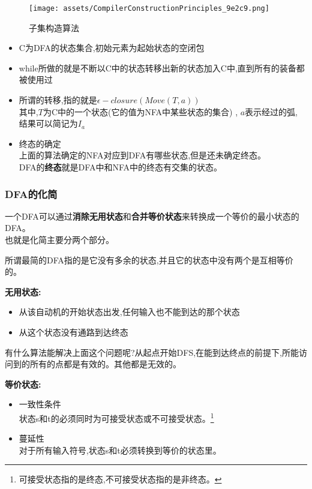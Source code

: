 \documentclass[UTF8,a4paper]{ctexart}
\newcommand{\spaceline}{\vspace{\baselineskip}}
\begin{document}
  \begin{figure}[H]
    \centering
    \texttt{[image: assets/CompilerConstructionPrinciples\_9e2c9.png]}
    \caption{子集构造算法}
    \label{fig-zijifa}
  \end{figure}

  \begin{itemize}
    \item C为DFA的状态集合,初始元素为起始状态的空闭包
    \item while所做的就是不断以C中的状态转移出新的状态加入C中,直到所有的装备都被使用过
    \item 所谓的转移,指的就是$\epsilon-closure(Move(T,a))$\\
    其中,$T$为C中的一个状态(它的值为NFA中某些状态的集合) , $a$表示经过的弧, 结果可以简记为$I_a$
    \item 终态的确定\\
    上面的算法确定的NFA对应到DFA有哪些状态,但是还未确定终态。\\
    DFA的\textbf{终态}就是DFA中和NFA中的终态有交集的状态。
  \end{itemize}

  \subsubsection{DFA的化简}
  一个DFA可以通过\textbf{消除无用状态}和\textbf{合并等价状态}来转换成一个等价的最小状态的DFA。\\
  也就是化简主要分两个部分。

  \spaceline
  所谓最简的DFA指的是它没有多余的状态,并且它的状态中没有两个是互相等价的。

  \spaceline
  \textbf{无用状态:}
  \begin{itemize}
    \item 从该自动机的开始状态出发,任何输入也不能到达的那个状态
    \item 从这个状态没有通路到达终态
  \end{itemize}
  {\color{blue}有什么算法能解决上面这个问题呢?从起点开始DFS,在能到达终点的前提下,所能访问到的所有的点都是有效的。其他都是无效的。}

  \spaceline
  \textbf{等价状态:}
  \begin{itemize}
    \item [(1)] 一致性条件\\
    状态s和t的必须同时为可接受状态或不可接受状态。\footnote{可接受状态指的是终态,不可接受状态指的是非终态。}
    \item [(2)] 蔓延性\\
    对于所有输入符号,状态s和t必须转换到等价的状态里。
  \end{itemize}
\end{document}
